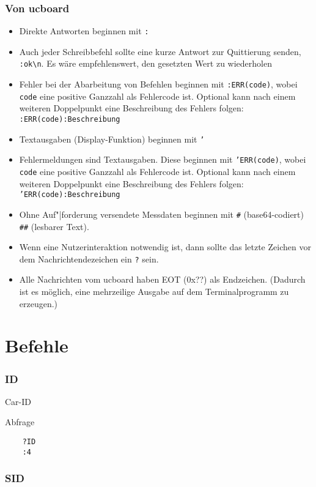 \subsubsection{Von ucboard}
\begin{itemize}
	\item Direkte Antworten beginnen mit \texttt{:}
	\item Auch jeder Schreibbefehl sollte eine kurze Antwort zur Quittierung senden, \zB \verb+:ok\n+. Es wäre empfehlenswert, den gesetzten Wert zu wiederholen
	\item Fehler bei der Abarbeitung von Befehlen beginnen mit \texttt{:ERR(code)}, wobei \texttt{code} eine positive Ganzzahl als Fehlercode ist. Optional kann nach einem weiteren Doppelpunkt eine Beschreibung des Fehlers folgen: \texttt{:ERR(code):Beschreibung} 
	\item Textausgaben (Display-Funktion) beginnen mit \texttt{'}
	\item Fehlermeldungen sind Textausgaben. Diese beginnen mit \texttt{'ERR(code)}, wobei \texttt{code} eine positive Ganzzahl als Fehlercode ist. Optional kann nach einem weiteren Doppelpunkt eine Beschreibung des Fehlers folgen: \texttt{'ERR(code):Beschreibung} 
	\item Ohne Auf"|forderung versendete Messdaten beginnen mit \texttt{\#} (base64-codiert) \bzw \texttt{\#\#} (lesbarer Text).
	\item Wenn eine Nutzerinteraktion notwendig ist, dann sollte das letzte Zeichen vor dem Nachrichtendezeichen ein \texttt{?} sein.
	\item Alle Nachrichten vom ucboard haben EOT (0x??) als Endzeichen. (Dadurch ist es möglich, eine mehrzeilige Ausgabe auf dem Terminalprogramm zu erzeugen.)
\end{itemize}


\section{Befehle}

\subsubsection{ID}

Car-ID

Abfrage 

\begin{verbatim}
	?ID
	:4
\end{verbatim}


\subsubsection{SID}

